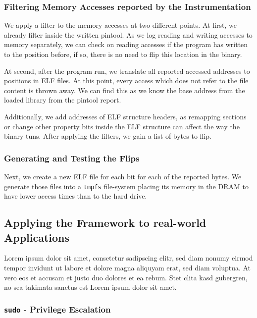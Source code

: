 \subsubsection{Filtering Memory Accesses reported by the Instrumentation}

We apply a filter to the memory accesses at two different points. At first, we
already filter inside the written pintool. As we log reading and writing
accesses to memory separately, we can check on reading accesses if the program
has written to the position before, if so, there is no need to flip this
location in the binary.

At second, after the program run, we translate all reported accessed addresses
to positions in ELF files. At this point, every access which does not refer to
the file content is thrown away. We can find this as we know the base address
from the loaded library from the pintool report.

Additionally, we add addresses of ELF structure headers, as remapping sections
or change other property bits inside the ELF structure can affect the way the
binary tuns. After applying the filters, we gain a list of bytes to flip.

\subsubsection{Generating and Testing the Flips}

Next, we create a new ELF file for each bit for each of the reported bytes. We
generate those files into a \texttt{tmpfs} file-system placing its memory in
the DRAM to have lower access times than to the hard drive.

\subsection{Applying the Framework to real-world Applications}

Lorem ipsum dolor sit amet, consetetur sadipscing elitr, sed diam nonumy eirmod
tempor invidunt ut labore et dolore magna aliquyam erat, sed diam voluptua. At
vero eos et accusam et justo duo dolores et ea rebum. Stet clita kasd gubergren,
no sea takimata sanctus est Lorem ipsum dolor sit amet.

\subsubsection{\texttt{sudo} - Privilege Escalation}

